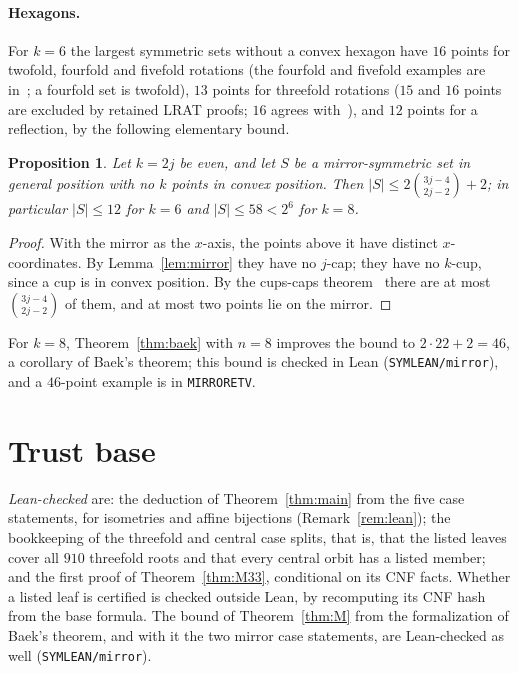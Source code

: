 \documentclass[11pt]{article}
\newtheorem{proposition}[theorem]{Proposition}
\theoremstyle{remark}
\begin{document}
\paragraph{Hexagons.} For $k=6$ the largest symmetric sets without a convex hexagon have $16$ points for twofold,
fourfold and fivefold rotations (the fourfold and fivefold examples are in~\cite{SMQH25}; a fourfold set is twofold),
$13$ points for threefold rotations ($15$ and $16$ points are excluded by retained LRAT proofs; $16$ agrees
with~\cite{SMQH25}), and $12$ points for a reflection, by the following elementary bound.

\begin{proposition}\label{prop:mirror}
Let $k=2j$ be even, and let $S$ be a mirror-symmetric set in general position with no $k$ points in convex position. Then
$|S|\le 2\binom{3j-4}{2j-2}+2$; in particular $|S|\le 12$ for $k=6$ and $|S|\le 58<2^{6}$ for $k=8$.
\end{proposition}
\begin{proof}
With the mirror as the $x$-axis, the points above it have distinct $x$-coordinates. By Lemma~\ref{lem:mirror} they have no
$j$-cap; they have no $k$-cup, since a cup is in convex position. By the cups-caps theorem~\cite{ES35} there are at most
$\binom{3j-4}{2j-2}$ of them, and at most two points lie on the mirror.
\end{proof}
For $k=8$, Theorem~\ref{thm:baek} with $n=8$ improves the bound to $2\cdot22+2=46$, a corollary of Baek's theorem; this
bound is checked in Lean (\texttt{SYMLEAN/mirror}), and a $46$-point example is in \texttt{MIRRORETV}.

\section{Trust base}\label{sec:trust}
\emph{Lean-checked} are: the deduction of Theorem~\ref{thm:main} from the five case statements, for isometries and affine
bijections (Remark~\ref{rem:lean}); the bookkeeping of the threefold and central case splits, that is, that the listed
leaves cover all $910$ threefold roots and that every central orbit has a listed member; and the first proof of
Theorem~\ref{thm:M33}, conditional on its CNF facts. Whether a listed leaf is certified is checked outside Lean, by
recomputing its CNF hash from the base formula. The bound of Theorem~\ref{thm:M} from the formalization of Baek's
theorem, and with it the two mirror case statements, are Lean-checked as well (\texttt{SYMLEAN/mirror}).
\end{document}
